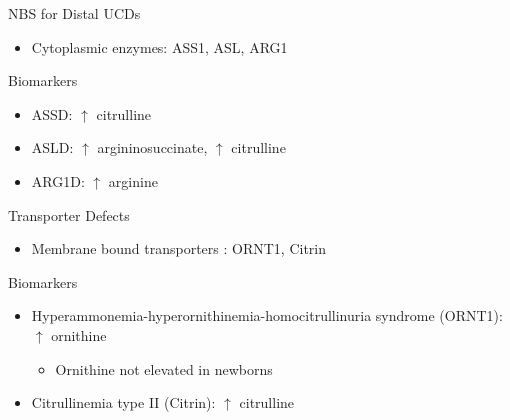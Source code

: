 \documentclass[presentation, smaller]{beamer}
\begin{document}
\begin{frame}[label={sec:orgheadline10}]{NBS for Distal UCDs}
\begin{itemize}
\item Cytoplasmic enzymes: ASS1, ASL, ARG1
\end{itemize}

\begin{block}{Biomarkers}
\begin{itemize}
\item ASSD: \(\uparrow\) citrulline
\item ASLD: \(\uparrow\) argininosuccinate, \(\uparrow\) citrulline
\item ARG1D: \(\uparrow\) arginine
\end{itemize}
\end{block}
\end{frame}

\begin{frame}[label={sec:orgheadline11}]{Transporter Defects}
\begin{itemize}
\item Membrane bound transporters : ORNT1, Citrin
\end{itemize}

\begin{block}{Biomarkers}
\begin{itemize}
\item Hyperammonemia-hyperornithinemia-homocitrullinuria syndrome (ORNT1): \(\uparrow\) ornithine
\begin{itemize}
\item Ornithine not elevated in newborns
\end{itemize}
\item Citrullinemia type II (Citrin): \(\uparrow\) citrulline
\end{itemize}
\end{block}
\end{frame}
\end{document}
